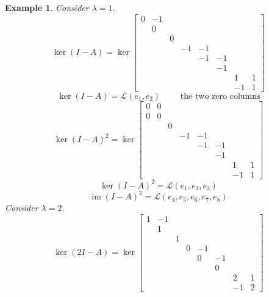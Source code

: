 \documentclass[a4paper]{article}
\newcounter{lecref}[section]
\numberwithin{lecref}{section}
\newtheorem{example}[lecref]{Example}
\DeclareMathOperator{\im}{im}
\begin{document}
\begin{example}
  Consider $\lambda = 1$.
  \[
    \ker\left( I - A \right) =
    \ker\begin{bmatrix}
      0 & -1 &   &    &    &    &    & \\
        & 0  &   &    &    &    &    & \\
        &    & 0 &    &    &    &    & \\
        &    &   & -1 & -1 &    &    & \\
        &    &   &    & -1 & -1 &    & \\
        &    &   &    &    & -1 &    & \\
        &    &   &    &    &    & 1  & 1 \\
        &    &   &    &    &    & -1 & 1
    \end{bmatrix}
  \]
  \[ \ker(I - A) = \mathcal L(e_1, e_2) \qquad \text{ the two zero columns} \]
  \[
    \ker(I - A)^2 = \ker\begin{bmatrix}
      0 & 0  &   &    &    &    &    & \\
      0 & 0  &   &    &    &    &    & \\
        &    & 0 &    &    &    &    & \\
        &    &   & -1 & -1 &    &    & \\ %
        &    &   &    & -1 & -1 &    & \\ %
        &    &   &    &    & -1 &    & \\ %
        &    &   &    &    &    & 1  & 1 \\ %
        &    &   &    &    &    & -1 & 1    %
    \end{bmatrix}
  \]
  \[ \ker(I - A)^2 = \mathcal L(e_1, e_2, e_3) \]
  \[ \im(I - A)^2 = \mathcal L(e_4, e_5, e_6, e_7, e_8) \]
  Consider $\lambda = 2$.
  \[
    \ker(2I - A) = \ker\begin{bmatrix}
      1 & -1 &   &    &    &    &    & \\
        & 1  &   &    &    &    &    & \\
        &    & 1 &    &    &    &    & \\
        &    &   & 0  & -1 &    &    & \\
        &    &   &    & 0  & -1 &    & \\
        &    &   &    &    & 0  &    & \\
        &    &   &    &    &    & 2  & 1 \\
        &    &   &    &    &    & -1 & 2
    \end{bmatrix}
\]
\end{example}
\end{document}
